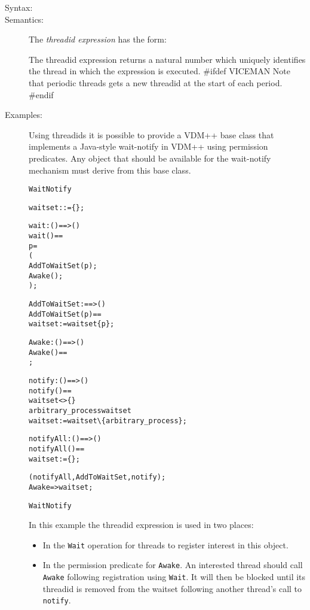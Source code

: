 \documentclass[\pformat,12pt]{article}
\begin{document}
\begin{description}
\item[Syntax:] 
  
\item[Semantics:] The {\it threadid expression} has the form:

  \begin{alltt}
  \end{alltt}
  The threadid expression returns a natural number which uniquely
  identifies the thread in which the expression is executed.
#ifdef VICEMAN
  Note that periodic threads gets a new threadid at the start of each period.
#endif

\item[Examples:] 
Using threadids it is possible to provide a VDM++ base class that
implements a Java-style wait-notify in VDM++ using permission
predicates. Any object that should be available for the wait-notify
mechanism must derive from this base class.  
\begin{alltt}
 WaitNotify

    waitset :  := \{\};

    \PROTECTED wait: () ==> ()
    wait() == 
       p = 
       (
        AddToWaitSet( p );
        Awake();
       );

    AddToWaitSet :  ==> ()
    AddToWaitSet( p ) ==
      waitset := waitset  \{ p \};
      
    Awake: () ==> ()
    Awake() == 
      ;
  
    \PROTECTED notify: () ==> ()
    notify() == 
         waitset <> \{\} 
           arbitrary_process  waitset
            waitset := waitset \verb+\+ \{arbitrary_process\};

    \PROTECTED notifyAll: () ==> ()
    notifyAll() ==
         waitset := \{\};

    (notifyAll, AddToWaitSet, notify);
     Awake =>  waitset;

 WaitNotify
\end{alltt}
In this example the threadid expression is used in two places:
\begin{itemize}
\item In the \texttt{Wait} operation for threads to register interest
  in this object.
\item In the permission predicate for \texttt{Awake}. An interested
  thread should call \texttt{Awake} following registration using
  \texttt{Wait}. It will then be blocked until its threadid is removed
  from the waitset following another thread's call to \texttt{notify}.
\end{itemize}


\end{description}
\end{document}
